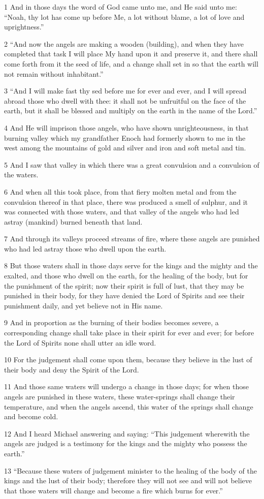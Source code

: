 \par 1 And in those days the word of God came unto me, and He said unto me: “Noah, thy lot has come up before Me, a lot without blame, a lot of love and uprightness.”
\par 2 “And now the angels are making a wooden (building), and when they have completed that task I will place My hand upon it and preserve it, and there shall come forth from it the seed of life, and a change shall set in so that the earth will not remain without inhabitant.”
\par 3 “And I will make fast thy sed before me for ever and ever, and I will spread abroad those who dwell with thee: it shall not be unfruitful on the face of the earth, but it shall be blessed and multiply on the earth in the name of the Lord.”
\par 4 And He will imprison those angels, who have shown unrighteousness, in that burning valley which my grandfather Enoch had formerly shown to me in the west among the mountains of gold and silver and iron and soft metal and tin.
\par 5 And I saw that valley in which there was a great convulsion and a convulsion of the waters.
\par 6 And when all this took place, from that fiery molten metal and from the convulsion thereof in that place, there was produced a smell of sulphur, and it was connected with those waters, and that valley of the angels who had led astray (mankind) burned beneath that land.
\par 7 And through its valleys proceed streams of fire, where these angels are punished who had led astray those who dwell upon the earth.
\par 8 But those waters shall in those days serve for the kings and the mighty and the exalted, and those who dwell on the earth, for the healing of the body, but for the punishment of the spirit; now their spirit is full of lust, that they may be punished in their body, for they have denied the Lord of Spirits and see their punishment daily, and yet believe not in His name.
\par 9 And in proportion as the burning of their bodies becomes severe, a corresponding change shall take place in their spirit for ever and ever; for before the Lord of Spirits none shall utter an idle word.
\par 10 For the judgement shall come upon them, because they believe in the lust of their body and deny the Spirit of the Lord.
\par 11 And those same waters will undergo a change in those days; for when those angels are punished in these waters, these water-springs shall change their temperature, and when the angels ascend, this water of the springs shall change and become cold.
\par 12 And I heard Michael answering and saying: “This judgement wherewith the angels are judged is a testimony for the kings and the mighty who possess the earth.”
\par 13 “Because these waters of judgement minister to the healing of the body of the kings and the lust of their body; therefore they will not see and will not believe that those waters will change and become a fire which burns for ever.”

